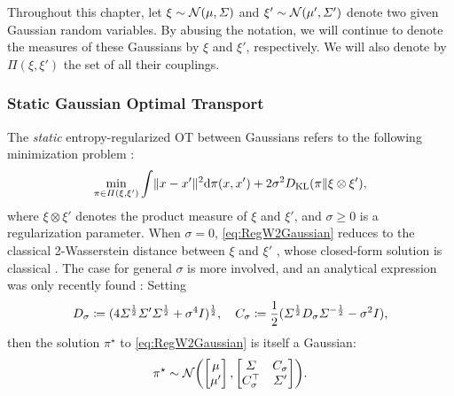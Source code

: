 Throughout this chapter, let $\xi \sim \mathcal{N}(\mu, \Sigma)$ and $\xi' \sim \mathcal{N}(\mu', \Sigma')$ denote two given Gaussian random variables. By abusing the notation, we will continue to denote the measures of these Gaussians by $\xi$ and $\xi'$, respectively. We will also denote by $\Pi(\xi,\xi')$ the set of all their couplings. 

\subsubsection{Static Gaussian Optimal Transport}
\label{sec:staticGOT}

The \emph{static} entropy-regularized \acrshort{OT} between Gaussians refers to the following minimization problem \citep{peyre2019computational}:
\begin{equation}
\label{eq:RegW2Gaussian}
\min_{\pi \in \Pi(\xi, \xi')} \int  \lVert x-x'\rVert^2  \mathrm{d} \pi(x, x') + 2\sigma^2 D_{\mathrm{KL}}(\pi \| \xi \otimes \xi'),
\end{equation}where $\xi\otimes\xi'$ denotes the product measure of $\xi$ and $\xi'$, and $\sigma \geq 0$ is a regularization parameter. When $\sigma = 0$, \eqref{eq:RegW2Gaussian} reduces to the classical 2-Wasserstein distance between $\xi$ and $\xi'$ \citep{villani2009optimal}, whose closed-form solution is classical \citep{dowson1982frechet, olkin1982distance}. The case for general $\sigma$ is more involved, and an analytical expression was only recently found \citep{bojilov2016matching, del2020statistical, janati2020entropic, mallasto2021entropy}: Setting%
\begin{equation}
\label{eq:Cstar}
D_\sigma \coloneqq ( 4\Sigma^{\frac{1}{2}} \Sigma' \Sigma^{\frac{1}{2}} + \sigma^4I  )^{\frac{1}{2}},\quad C_\sigma \coloneqq \frac{1}{2}(\Sigma^{\frac{1}{2}} D_\sigma \Sigma^{-\frac{1}{2}} - \sigma^2I),
\end{equation}
then the solution $\pi^\star$ to \eqref{eq:RegW2Gaussian} is itself a Gaussian:
\begin{align}
\label{eq:StaticGaussianSB-sol}
\pi^\star \sim \Ncal \parens*{  \begin{bmatrix}
\mu \\
\mu'
\end{bmatrix},  \begin{bmatrix}
\Sigma&C_\sigma\\
C_\sigma^\top&\Sigma'
\end{bmatrix}}.
\end{align}

